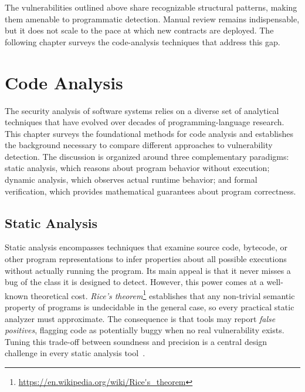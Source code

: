 The vulnerabilities outlined above share recognizable structural patterns, making them amenable to programmatic detection. Manual review remains indispensable, but it does not scale to the pace at which new contracts are deployed. The following chapter surveys the code-analysis techniques that address this gap.


\chapter{Code Analysis}
\label{ch:code-analysis}

The security analysis of software systems relies on a diverse set of analytical techniques that have evolved over decades of programming-language research. This chapter surveys the foundational methods for code analysis and establishes the background necessary to compare different approaches to vulnerability detection. The discussion is organized around three complementary paradigms: static analysis, which reasons about program behavior without execution; dynamic analysis, which observes actual runtime behavior; and formal verification, which provides mathematical guarantees about program correctness.

\section{Static Analysis}
\label{sec:static-analysis}

Static analysis encompasses techniques that examine source code, bytecode, or other program representations to infer properties about all possible executions without actually running the program. Its main appeal is that it never misses a bug of the class it is designed to detect. However, this power comes at a well-known theoretical cost. \emph{Rice's theorem}\footnote{\url{https://en.wikipedia.org/wiki/Rice's_theorem}} establishes that any non-trivial semantic property of programs is undecidable in the general case, so every practical static analyzer must approximate. The consequence is that tools may report \emph{false positives}, flagging code as potentially buggy when no real vulnerability exists. Tuning this trade-off between soundness and precision is a central design challenge in every static analysis tool~\cite{nielson1999principles, rice1953classes}.

